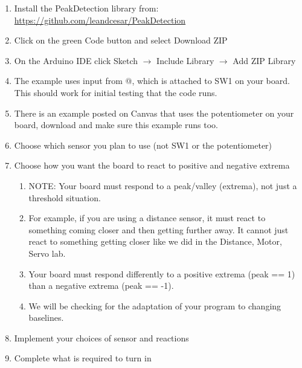 \begin{enumerate}
    \item Install the PeakDetection library from:\\
          \href{https://github.com/leandcesar/PeakDetection}{https://github.com/leandcesar/PeakDetection}
    \item Click on the green Code button and select Download ZIP
    \item On the Arduino IDE click Sketch $\rightarrow$ Include Library $\rightarrow$ Add ZIP Library
    \item The example uses input from @, which is attached to SW1 on your board. 
            This should work for initial testing that the code runs.
    \item There is an example posted on Canvas that uses the potentiometer on your board, download
            and make sure this example runs too.
    \item Choose which sensor you plan to use (not SW1 or the potentiometer)
    \item Choose how you want the board to react to positive and negative extrema 
    \begin{enumerate}
        \item NOTE: Your board must respond to a peak/valley (extrema), not just a threshold situation.
        \item For example, if you are using a distance sensor, it must react to something
                coming closer and then getting further away. It cannot just react to something 
                getting closer like we did in the Distance, Motor, Servo lab.
        \item Your board must respond differently to a positive extrema (peak == 1) than a 
                negative extrema (peak == -1).
        \item We will be checking for the adaptation of your program to changing baselines. 
    \end{enumerate}
    \item Implement your choices of sensor and reactions
    \item Complete what is required to turn in
\end{enumerate}

